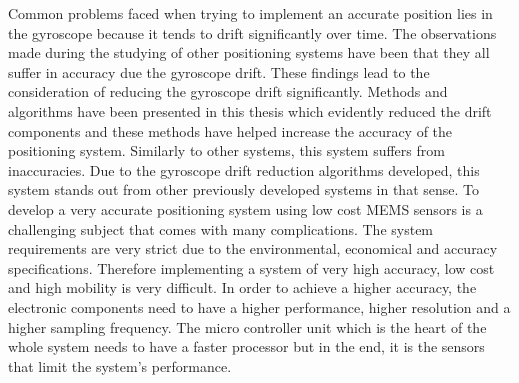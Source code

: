 Common problems faced when trying to implement an accurate position lies in the gyroscope because it tends to drift significantly over time. The observations made during the studying of other positioning systems have been that they all suffer in accuracy due the gyroscope drift. These findings lead to the consideration of reducing the gyroscope drift significantly. Methods and algorithms have been presented in this thesis which evidently reduced the drift components and these methods have helped increase the accuracy of the positioning system. Similarly to other systems, this system suffers from inaccuracies. Due to the gyroscope drift reduction algorithms developed, this system stands out from other previously developed systems in that sense. To develop a very accurate positioning system using low cost MEMS sensors is a challenging subject that comes with many complications. The system requirements are very strict due to the environmental, economical and accuracy specifications. Therefore implementing a system of very high accuracy, low cost and high mobility is very difficult. In order to achieve a higher accuracy, the electronic components need to have a higher performance, higher resolution and a higher sampling frequency. The micro controller unit which is the heart of the whole system needs to have a faster processor but in the end, it is the sensors that limit the system's performance.